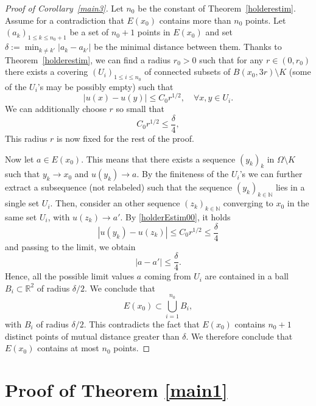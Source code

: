 \documentclass[12pt]{article}
\theoremstyle{definition}
\theoremstyle{remark}
\numberwithin{equation}{section}
\newcommand{\R}{\mathbb{R}}
\newcommand{\N}{\mathbb{N}}
\begin{document}
\begin{proof}[Proof of Corollary~\ref{main3}]
    Let $n_0$ be the constant of Theorem~\ref{holderestim}. Assume for a contradiction that $E(x_0)$ contains more than $n_0$ points. Let $(a_k)_{1\leq k\leq n_0+1}$ be a set of $n_0+1$ points in $E(x_0)$ and set $\delta:= \min_{k\neq k'}|a_k-a_{k'}|$ be the minimal distance between them.
    Thanks to Theorem~\ref{holderestim}, we can find a radius $r_0 > 0$ such that for any $r\in (0,r_0)$ there exists a covering $(U_i)_{1\leq i\leq n_0}$ of connected subsets of $B(x_0,3r)\setminus K$ (some of the $U_i$'s may be possibly empty) such that
    \begin{equation}
        |u(x)-u(y)|\leq C_0r^{1/2},\quad\forall x,y\in U_i. \label{holderEstim00}
    \end{equation}
    We can additionally choose $r$ so small that
    \begin{equation}
        C_0 r^{1/2}\leq \frac{\delta}{4},
    \end{equation}
    This radius $r$ is now fixed for the rest of the proof.

    Now let $a \in E(x_0)$. This means that there exists a sequence $(y_k)_k$ in $\Omega \setminus K$ such that $y_k\to x_0$ and $u(y_k)\to a$.
    By the finiteness of the $U_i$'s we can further extract a subsequence (not relabeled) such that the sequence $(y_k)_{k\in\N}$ lies in a single set $U_i$. 
    Then, consider an other sequence $(z_k)_{k\in\N}$ converging to $x_0$ in the same set $U_i$, with $u(z_k)\to a'$. By \eqref{holderEstim00}, it holds
    \[|u(y_k)-u(z_{k})|\leq C_0 r^{1/2}\leq \frac{\delta}{4}\]
    and passing to the limit, we obtain
    \begin{equation}
        |a-a'|\leq \frac{\delta}{4}.\label{distll}
    \end{equation}
    Hence, all the possible limit values $a$ coming from $U_i$ are contained in a ball $B_i\subset \R^2$ of radius   $\delta/2$. 
    We conclude that
    \[E(x_0)\subset \bigcup_{i=1}^{n_0} B_i,\]
    with $B_i$ of radius  $\delta/2$. This contradicts the fact that $E(x_0)$ contains $n_0+1$ distinct points of mutual distance greater than $\delta$. We therefore conclude that $E(x_0)$ contains at most $n_0$ points.
\end{proof} 

\section{Proof of Theorem \ref{main1}}\label{SBV}
\end{document}
